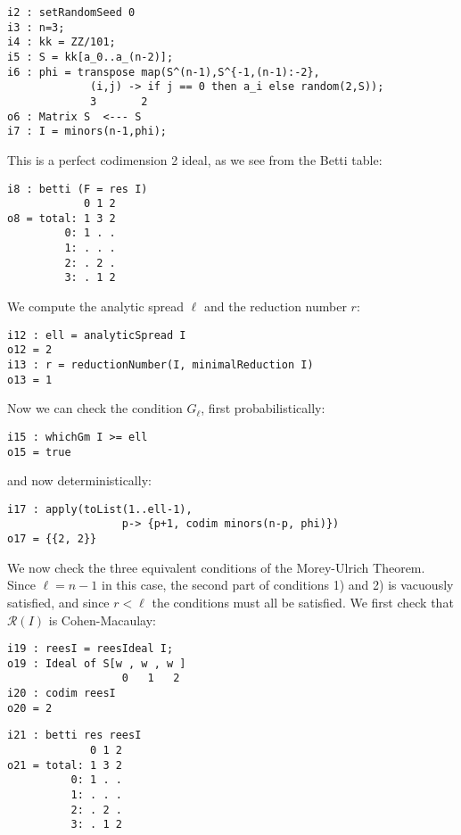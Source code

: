 \documentclass[twoside,12pt, leqno]{amsart}
\def\RR{{\mathcal R}}
\begin{document}
\begin{footnotesize}
 \begin{verbatim}
i2 : setRandomSeed 0
i3 : n=3;
i4 : kk = ZZ/101;
i5 : S = kk[a_0..a_(n-2)];
i6 : phi = transpose map(S^(n-1),S^{-1,(n-1):-2},
             (i,j) -> if j == 0 then a_i else random(2,S));
             3       2
o6 : Matrix S  <--- S
i7 : I = minors(n-1,phi);
\end{verbatim}
\end{footnotesize}
This is a perfect codimension 2 ideal, as we see from the Betti table:
\begin{footnotesize}
 \begin{verbatim}
i8 : betti (F = res I)
            0 1 2
o8 = total: 1 3 2
         0: 1 . .
         1: . . .
         2: . 2 .
         3: . 1 2
\end{verbatim}
 \end{footnotesize}
We  compute the analytic spread $\ell$ and the reduction number $r$:
\begin{footnotesize}
 \begin{verbatim}
i12 : ell = analyticSpread I
o12 = 2
i13 : r = reductionNumber(I, minimalReduction I)
o13 = 1
\end{verbatim}
\end{footnotesize}
Now we can check the condition $G_{\ell}$, first probabilistically:
\begin{footnotesize}
 \begin{verbatim}
i15 : whichGm I >= ell
o15 = true
\end{verbatim}
\end{footnotesize}
and now deterministically:
\begin{footnotesize}
 \begin{verbatim}
i17 : apply(toList(1..ell-1), 
                  p-> {p+1, codim minors(n-p, phi)})
o17 = {{2, 2}}
\end{verbatim}
\end{footnotesize}
We now check the three equivalent conditions of the Morey-Ulrich Theorem.
           Since $\ell = n-1$ in this case, the second part of conditions
           1) and 2) is vacuously satisfied, and since $r<\ell$
           the conditions must all be satisfied.
           We first check that $\RR(I)$ is Cohen-Macaulay:
\begin{footnotesize}
 \begin{verbatim}
i19 : reesI = reesIdeal I;
o19 : Ideal of S[w , w , w ]
                  0   1   2
i20 : codim reesI
o20 = 2
\end{verbatim}
 \goodbreak
\begin{verbatim}
i21 : betti res reesI
             0 1 2
o21 = total: 1 3 2
          0: 1 . .
          1: . . .
          2: . 2 .
          3: . 1 2
\end{verbatim}
\end{footnotesize}
\end{document}
